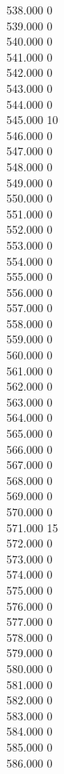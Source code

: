 { 538.000	0 \\
 539.000	0 \\
 540.000	0 \\
 541.000	0 \\
 542.000	0 \\
 543.000	0 \\
 544.000	0 \\
 545.000	10 \\
 546.000	0 \\
 547.000	0 \\
 548.000	0 \\
 549.000	0 \\
 550.000	0 \\
 551.000	0 \\
 552.000	0 \\
 553.000	0 \\
 554.000	0 \\
 555.000	0 \\
 556.000	0 \\
 557.000	0 \\
 558.000	0 \\
 559.000	0 \\
 560.000	0 \\
 561.000	0 \\
 562.000	0 \\
 563.000	0 \\
 564.000	0 \\
 565.000	0 \\
 566.000	0 \\
 567.000	0 \\
 568.000	0 \\
 569.000	0 \\
 570.000	0 \\
 571.000	15 \\
 572.000	0 \\
 573.000	0 \\
 574.000	0 \\
 575.000	0 \\
 576.000	0 \\
 577.000	0 \\
 578.000	0 \\
 579.000	0 \\
 580.000	0 \\
 581.000	0 \\
 582.000	0 \\
 583.000	0 \\
 584.000	0 \\
 585.000	0 \\
 586.000	0 \\
}
